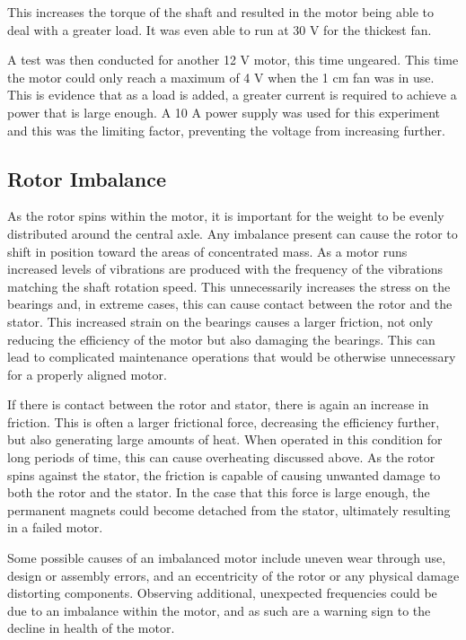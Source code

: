This increases the torque of the shaft and resulted in the motor being able to deal with a greater load. It was even able to run at 30 V for the thickest fan.

A test was then conducted for another 12 V motor, this time ungeared. This time the motor could only reach a maximum of 4 V when the 1 cm fan was in use. This is evidence that as a load is added, a greater current is required to achieve a power that is large enough. A 10 A power supply was used for this experiment and this was the limiting factor, preventing the voltage from increasing further.

\subsection{Rotor Imbalance}
As the rotor spins within the motor, it is important for the weight to be evenly distributed around the central axle. Any imbalance present can cause the rotor to shift in position toward the areas of concentrated mass. As a motor runs increased levels of vibrations are produced with the frequency of the vibrations matching the shaft rotation speed. This unnecessarily increases the stress on the bearings and, in extreme cases, this can cause contact between the rotor and the stator. This increased strain on the bearings causes a larger friction, not only reducing the efficiency of the motor but also damaging the bearings. This can lead to complicated maintenance operations that would be otherwise unnecessary for a properly aligned motor.

If there is contact between the rotor and stator, there is again an increase in friction. This is often a larger frictional force, decreasing the efficiency further, but also generating large amounts of heat. When operated in this condition for long periods of time, this can cause overheating discussed above. As the rotor spins against the stator, the friction is capable of causing unwanted damage to both the rotor and the stator. In the case that this force is large enough, the permanent magnets could become detached from the stator, ultimately resulting in a failed motor.

Some possible causes of an imbalanced motor include uneven wear through use, design or assembly errors, and an eccentricity of the rotor or any physical damage distorting components. Observing additional, unexpected frequencies could be due to an imbalance within the motor, and as such are a warning sign to the decline in health of the motor. 

